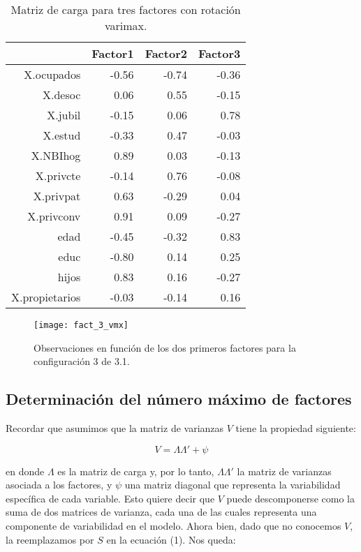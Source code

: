 \documentclass[a4paper,10pt]{article}
\begin{document}
\begin{enumerate}
  \begin{table}[ht]
  \centering
  \begin{tabular}{rrrr}
    \hline
  & Factor1 & Factor2 & Factor3 \\ 
    \hline
  X.ocupados & -0.56 & -0.74 & -0.36 \\ 
    X.desoc & 0.06 & 0.55 & -0.15 \\ 
    X.jubil & -0.15 & 0.06 & 0.78 \\ 
    X.estud & -0.33 & 0.47 & -0.03 \\ 
    X.NBIhog & 0.89 & 0.03 & -0.13 \\ 
    X.privcte & -0.14 & 0.76 & -0.08 \\ 
    X.privpat & 0.63 & -0.29 & 0.04 \\ 
    X.privconv & 0.91 & 0.09 & -0.27 \\ 
    edad & -0.45 & -0.32 & 0.83 \\ 
    educ & -0.80 & 0.14 & 0.25 \\ 
    hijos & 0.83 & 0.16 & -0.27 \\ 
    X.propietarios & -0.03 & -0.14 & 0.16 \\ 
    \hline
  \end{tabular}
  \caption{Matriz de carga para tres factores con rotación varimax.}
  \end{table}
 
  \begin{figure}[h]
  \centering
  \texttt{[image: fact\_3\_vmx]}
  \caption{Observaciones en función de los dos primeros factores para la configuración 3 de 3.1.}
  \end{figure}
 
\end{enumerate}


\subsection{Determinación del número máximo de factores}

Recordar que asumimos que la matriz de varianzas $V$ tiene la propiedad siguiente:

\begin{equation}
 V = \Lambda\Lambda' + \psi
\end{equation}

en donde $\Lambda$ es la matriz de carga y, por lo tanto, $\Lambda\Lambda'$ la matriz de varianzas asociada a los factores, y $\psi$ una matriz diagonal
que representa la variabilidad específica de cada variable.
Esto quiere decir que $V$ puede descomponerse como la suma de dos matrices de varianza, cada una de las cuales representa una componente de variabilidad
en el modelo.
Ahora bien, dado que no conocemos $V$, la reemplazamos por $S$ en la ecuación (1). Nos queda:
\end{document}
